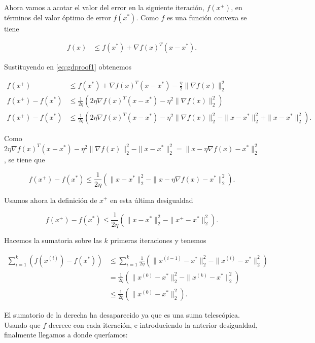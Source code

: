 Ahora vamos a acotar el valor del error en la siguiente iteración, $f(x^+)$, en términos del valor óptimo de error $f(x^*)$. Como $f$ es una función convexa se tiene

\begin{align*}
    f(x) &\leq f(x^*) + \nabla f(x)^T (x-x^*).
\end{align*}

Sustituyendo en \eqref{eq:gdproof1} obtenemos

\begin{align*}
    f(x^+) &\leq f(x^*) + \nabla f(x)^T (x-x^*) - \frac{\eta}{2} \| \nabla f(x) \| ^2_2 \\ 
    f(x^+) - f(x^*) &\leq  \frac{1}{2\eta}  \left ( 2 \eta \nabla f(x)^T (x-x^*) - \eta ^2 \| \nabla f(x) \| ^2_2 \right ) \\ 
    f(x^+) - f(x^*) &\leq  \frac{1}{2\eta}  \left ( 2 \eta \nabla f(x)^T (x-x^*) - \eta ^2 \| \nabla f(x) \| ^2_2 - \| x - x^* \|^2_2 + \| x - x^* \|^2_2 \right ).    
\end{align*}

Como $  2 \eta \nabla f(x)^T (x-x^*) - \eta ^2 \| \nabla f(x) \| ^2_2 - \| x - x^* \|^2_2 = \| x - \eta \nabla f(x) - x^* \|^2_2 $, se tiene que

$$ f(x^+) - f(x^*) \leq  \frac{1}{2\eta}  \left ( \| x - x^* \|^2_2 -  \| x - \eta \nabla f(x) - x^* \|^2_2 \right ) .$$

Usamos ahora la definición de $x^+$ en esta última desigualdad

$$ f(x^+) - f(x^*) \leq  \frac{1}{2\eta}  \left ( \| x - x^* \|^2_2 -  \| x^+ - x^* \|^2_2 \right ) .$$

Hacemos la sumatoria sobre las $k$ primeras iteraciones y tenemos

\begin{align*}
    \sum^k_{i=1} \left ( f(x^{(i)}) - f(x^*) \right ) &\leq \sum^k_{i=1} \frac{1}{2\eta}  \left ( \| x^{(i-1)} - x^* \|^2_2 -  \| x^{(i)} - x^* \|^2_2 \right ) \\ 
    &=\frac{1}{2\eta}  \left ( \| x^{(0)} - x^* \|^2_2 -  \| x^{(k)} - x^* \|^2_2 \right ) \\ 
    &\leq \frac{1}{2\eta}  \left ( \| x^{(0)} - x^* \|^2_2 \right ). 
\end{align*}

El sumatorio de la derecha ha desaparecido ya que es una suma telescópica. Usando que $f$ decrece con cada iteración, e introduciendo la anterior desigualdad, finalmente llegamos a donde queríamos:

